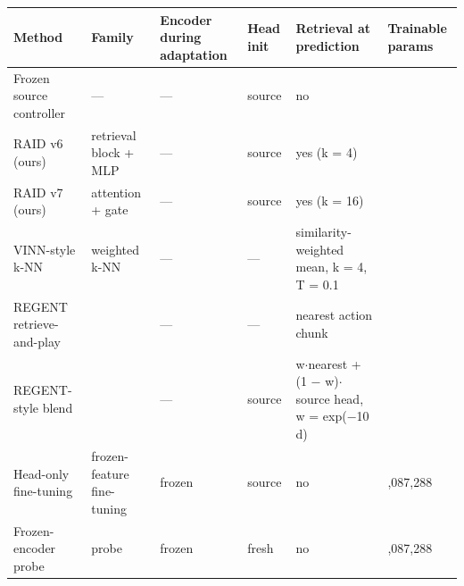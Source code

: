 \documentclass[11pt,a4paper]{article}
\begin{document}
{\def\LTcaptype{none} %
{\small
\begin{longtable}[]{@{}
  >{\raggedright\arraybackslash}p{}
  >{\raggedright\arraybackslash}p{}
  >{\raggedright\arraybackslash}p{}
  >{\raggedright\arraybackslash}p{}
  >{\raggedright\arraybackslash}p{}
  >{\raggedright\arraybackslash}p{}@{}}
\toprule\noalign{}
\begin{minipage}[b]{\linewidth}\raggedright
Method
\end{minipage} & \begin{minipage}[b]{\linewidth}\raggedright
Family
\end{minipage} & \begin{minipage}[b]{\linewidth}\raggedright
Encoder during adaptation
\end{minipage} & \begin{minipage}[b]{\linewidth}\raggedright
Head init
\end{minipage} & \begin{minipage}[b]{\linewidth}\raggedright
Retrieval at prediction
\end{minipage} & \begin{minipage}[b]{\linewidth}\raggedright
Trainable params
\end{minipage} \\
\midrule\noalign{}
\endhead
\bottomrule\noalign{}
\endlastfoot
Frozen source controller & --- & --- & source & no & 0 \\
RAID v6 (ours) & retrieval block + MLP & --- & source & yes (k = 4) & 0 \\
RAID v7 (ours) & attention + gate & --- & source & yes (k = 16) & 0 \\
VINN-style k-NN & weighted k-NN \cite{ref6} & --- & --- & similarity-weighted mean, k = 4, T = 0.1 & 0 \\
REGENT retrieve-and-play & \cite{ref7} & --- & --- & nearest action chunk & 0 \\
REGENT-style blend & \cite{ref7} & --- & source & w\ensuremath{\cdot}nearest + (1 \ensuremath{-} w)\ensuremath{\cdot}source head, w = exp(\ensuremath{-}10 d) & 0 \\
Head-only fine-tuning & frozen-feature fine-tuning & frozen & source & no & 1,087,288 \\
Frozen-encoder probe & probe \cite{ref39,ref40,ref41} & frozen & fresh & no & 1,087,288 \\

\end{longtable}}}
\end{document}
